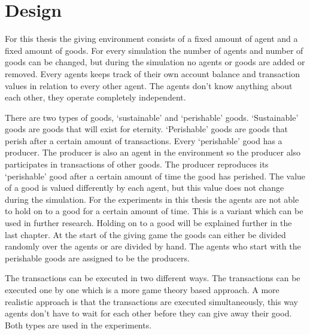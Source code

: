 \documentclass[twoside,openright]{uva-bachelor-thesis}
\begin{document}
\chapter{Design}
For this thesis the giving environment consists of a fixed amount of agent and a fixed amount of goods. For every simulation the number of agents and number of goods can be changed, but during the simulation no agents or goods are added or removed.  Every agents keeps track of their own account balance and transaction values in relation to every other agent. The agents don’t know anything about each other, they operate completely independent.

There are two types of goods, ‘sustainable’ and ‘perishable’ goods. ‘Sustainable’ goods are goods that will exist for eternity. ‘Perishable’ goods are goods that perish after a certain amount of transactions. Every ‘perishable’ good has a producer. The producer is also an agent in the environment so the producer also participates in transactions of other goods. The producer reproduces its ‘perishable’ good after a certain amount of time the good has perished. The value of a good is valued differently by each agent, but this value does not change during the simulation. For the experiments in this thesis the agents are not able to hold on to a good for a certain amount of time. This is a variant which can be used in further research. Holding on to a good will be explained further in the last chapter. At the start of the giving game the goods can either be divided randomly over the agents or are divided by hand. The agents who start with the perishable goods are assigned to be the producers.

The transactions can be executed in two different ways. The transactions can be executed one by one which is a more game theory based approach. A more realistic approach is that the transactions are executed simultaneously, this way agents don’t have to wait for each other before they can give away their good. Both types are used in the experiments.
\end{document}
